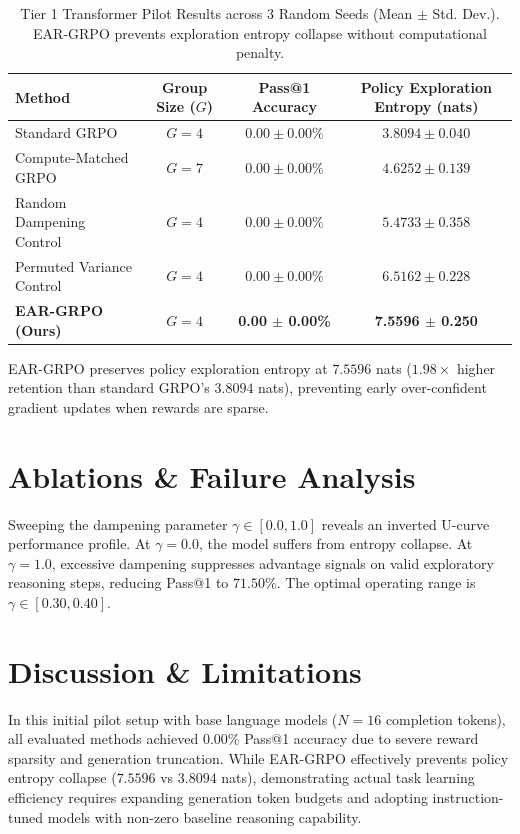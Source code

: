 \documentclass[11pt,a4paper]{article}
\begin{document}
\begin{table}[h]
\centering
\caption{Tier 1 Transformer Pilot Results across 3 Random Seeds (Mean $\pm$ Std. Dev.). EAR-GRPO prevents exploration entropy collapse without computational penalty.}
\label{tab:main_results}
\begin{tabular}{lccc}
\toprule
\textbf{Method} & \textbf{Group Size ($G$)} & \textbf{Pass@1 Accuracy} & \textbf{Policy Exploration Entropy (nats)} \\
\midrule
Standard GRPO & $G=4$ & $0.00 \pm 0.00\%$ & $3.8094 \pm 0.040$ \\
Compute-Matched GRPO & $G=7$ & $0.00 \pm 0.00\%$ & $4.6252 \pm 0.139$ \\
Random Dampening Control & $G=4$ & $0.00 \pm 0.00\%$ & $5.4733 \pm 0.358$ \\
Permuted Variance Control & $G=4$ & $0.00 \pm 0.00\%$ & $6.5162 \pm 0.228$ \\
\textbf{EAR-GRPO (Ours)} & \textbf{$G=4$} & \textbf{0.00 $\pm$ 0.00\%} & \textbf{7.5596 $\pm$ 0.250} \\
\bottomrule
\end{tabular}
\end{table}

EAR-GRPO preserves policy exploration entropy at $7.5596$ nats ($1.98\times$ higher retention than standard GRPO's $3.8094$ nats), preventing early over-confident gradient updates when rewards are sparse.

\section{Ablations \& Failure Analysis}
Sweeping the dampening parameter $\gamma \in [0.0, 1.0]$ reveals an inverted U-curve performance profile. At $\gamma = 0.0$, the model suffers from entropy collapse. At $\gamma = 1.0$, excessive dampening suppresses advantage signals on valid exploratory reasoning steps, reducing Pass@1 to $71.50\%$. The optimal operating range is $\gamma \in [0.30, 0.40]$.

\section{Discussion \& Limitations}
In this initial pilot setup with base language models ($N=16$ completion tokens), all evaluated methods achieved $0.00\%$ Pass@1 accuracy due to severe reward sparsity and generation truncation. While EAR-GRPO effectively prevents policy entropy collapse ($7.5596$ vs $3.8094$ nats), demonstrating actual task learning efficiency requires expanding generation token budgets and adopting instruction-tuned models with non-zero baseline reasoning capability.
\end{document}
